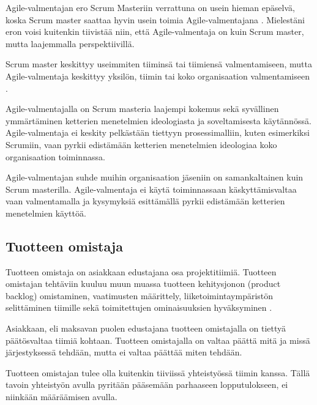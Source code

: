 \documentclass[a4paper]{article}
\begin{document}
Agile-valmentajan ero Scrum Masteriin verrattuna on usein hieman epäselvä, koska Scrum master saattaa hyvin usein toimia Agile-valmentajana \citep{grosjean2010}. Mielestäni eron voisi kuitenkin tiivistää niin, että Agile-valmentaja on kuin Scrum master, mutta laajemmalla perspektiivillä.

Scrum master keskittyy useimmiten tiiminsä tai tiimiensä valmentamiseen, mutta Agile-valmentaja keskittyy yksilön, tiimin tai koko organisaation valmentamiseen \citep{grosjean2010}. 

Agile-valmentajalla on Scrum masteria laajempi kokemus sekä syvällinen ymmärtäminen ketterien menetelmien ideologiasta ja soveltamisesta käytännössä. Agile-valmentaja ei keskity pelkästään tiettyyn prosessimalliin, kuten esimerkiksi Scrumiin, vaan pyrkii edistämään ketterien menetelmien ideologiaa koko organisaation toiminnassa.

Agile-valmentajan suhde muihin organisaation jäseniin on samankaltainen kuin Scrum masterilla. Agile-valmentaja ei käytä toiminnassaan käskyttämisvaltaa vaan valmentamalla ja kysymyksiä esittämällä pyrkii edistämään ketterien menetelmien käyttöä.

\subsection{Tuotteen omistaja}

Tuotteen omistaja on asiakkaan edustajana osa projektitiimiä. Tuotteen omistajan tehtäviin kuuluu muun muassa tuotteen kehitysjonon (product backlog) omistaminen, vaatimusten määrittely, liiketoimintaympäristön selittäminen tiimille sekä toimitettujen ominaisuuksien hyväksyminen \citep{augustine2005}.

Asiakkaan, eli maksavan puolen edustajana tuotteen omistajalla on tiettyä päätösvaltaa tiimiä kohtaan. Tuotteen omistajalla on valtaa päättä mitä ja missä järjestyksessä tehdään, mutta ei valtaa päättää miten tehdään.

Tuotteen omistajan tulee olla kuitenkin tiiviissä yhteistyössä tiimin kanssa. Tällä tavoin yhteistyön avulla pyritään pääsemään parhaaseen lopputulokseen, ei niinkään määräämisen avulla.



\end{document}
